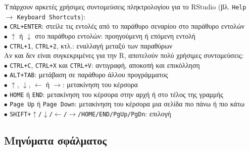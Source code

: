 \documentclass[a4paper,10pt,twocolumn]{article}
\begin{document}
Υπάρχουν αρκετές χρήσιμες συντομεύσεις πληκτρολογίου για το RStudio (βλ. \texttt{Help} $\rightarrow$
\texttt{Keyboard Shortcuts}):\\
$\bullet$ \texttt{CRL+ENTER}: στείλε τις εντολές από το παράθυρο σεναρίου στο παράθυρο εντολών\\
$\bullet$ $\uparrow$ ή $\downarrow$ στο παράθυρο εντολών: προηγούμενη ή επόμενη εντολή\\
$\bullet$ \texttt{CTRL+1}, \texttt{CTRL+2}, κτλ.: εναλλαγή μεταξύ των παραθύρων\\

\noindent Αν και δεν είναι συγκεκριμένες για την R, αποτελούν πολύ χρήσιμες συντομεύσεις:\\
$\bullet$ \texttt{CTRL+C}, \texttt{CTRL+X} και \texttt{CTRL+V}: αντιγραφή, αποκοπή και επικόλληση\\
$\bullet$ \texttt{ALT+TAB}: μετάβαση σε παράθυρο άλλου προγράμματος\\
$\bullet$ $\uparrow$, $\downarrow$, $\leftarrow$ ή $\rightarrow$: μετακίνηση του κέρσορα\\
$\bullet$ \texttt{HOME} ή \texttt{END}: μετακίνηση του κέρσορα στην αρχή ή στο τέλος της γραμμής\\
$\bullet$ \texttt{Page Up} ή \texttt{Page Down}: μετακίνηση του κέρσορα μια σελίδα πιο πάνω ή πιο κάτω\\
$\bullet$ \texttt{SHIFT+$\uparrow$/$\downarrow$/$\leftarrow$/$\rightarrow$/HOME/END/PgUp/PgDn}: επιλογή\\

\subsection{Μηνύματα σφάλματος}
\end{document}
